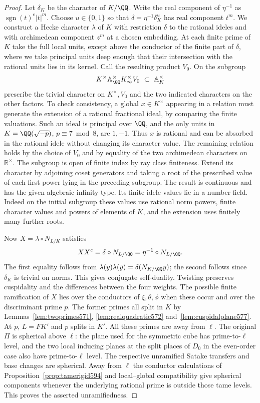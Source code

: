 \documentclass[a4paper,11pt]{article}
\theoremstyle{definition}
\theoremstyle{remark}
\numberwithin{equation}{section}
\begin{document}
\begin{proof}
Let \(\delta_K\) be the character of \(K/\QQ\).
Write the real component of \(\eta^{-1}\) as
\(\operatorname{sgn}(t)^e|t|^m\). Choose \(u\in\{0,1\}\)
so that \(\delta=\eta^{-1}\delta_K^u\) has real component
\(t^m\). We construct a Hecke character \(\lambda\) of
\(K\) with restriction \(\delta\) to the rational ideles
and with archimedean component \(z^m\) at a chosen embedding.
At each finite prime of \(K\) take the full local units,
except above the conductor of the finite part of \(\delta\),
where we take principal units deep enough that their
intersection with the rational units lies in its kernel.
Call the resulting product \(V_0\). On the subgroup
\[
          K^\times\mathbb A_\QQ^\times K_\infty^\times V_0
                      \ \subset\ \mathbb A_K^\times
\]
prescribe the trivial character on \(K^\times,V_0\) and the
two indicated characters on the other factors. To check
consistency, a global \(x\in K^\times\) appearing in a
relation must generate the extension of a rational
fractional ideal, by comparing the finite valuations.
Such an ideal is principal over \(\QQ\), and the only units
in \(K=\QQ(\sqrt{-p})\), \(p\equiv7\bmod8\), are \(1,-1\).
Thus \(x\) is rational and can be absorbed in the rational
idele without changing its character value. The remaining
relation holds by the choice of \(V_0\) and by equality
of the two archimedean characters on \(\mathbb R^\times\).
The subgroup is open of finite index by ray class finiteness.
Extend its character by adjoining coset generators and taking
a root of the prescribed value of each first power lying in
the preceding subgroup. The result is continuous and has
the given algebraic infinity type. Its finite-idele values
lie in a number field. Indeed on the initial subgroup these
values use rational norm powers, finite character values and
powers of elements of \(K\), and the extension uses finitely
many further roots.

Now \(X=\lambda\circ N_{L/K}\) satisfies
\[
              XX^c=\delta\circ N_{L/\QQ}
                   =\eta^{-1}\circ N_{L/\QQ}.
\]
The first equality follows from
\(\lambda(y)\lambda(\bar y)=\delta(N_{K/\QQ}y)\);
the second follows since \(\delta_K\) is trivial on norms.
This gives conjugate self-duality. Twisting preserves
cuspidality and the differences between the four weights.
The possible finite ramification of \(X\) lies over the
conductors of \(\xi,\theta,\phi\) when these occur and over
the discriminant prime \(p\). The former primes all split
in \(K\) by Lemmas~\ref{lem:twoprimes571},
\ref{lem:realquadratic572} and~\ref{lem:cuspidalplane577}.
At \(p\), \(L=FK'\) and \(p\) splits in \(K'\).
All these primes are away from \(\ell\). The original
\(\Pi\) is spherical above \(\ell\): the plane used for the
symmetric cube has prime-to-\(\ell\) level, and the two
local inducing planes at the split places of \(D_0\) in
the even-order case also have prime-to-\(\ell\) level.
The respective unramified Satake transfers and base changes
are spherical. Away from \(\ell\) the conductor calculations
of Proposition~\ref{prop:tamerigid594} and local--global
compatibility give spherical components whenever the
underlying rational prime is outside those tame levels.
This proves the asserted unramifiedness.


\end{proof}
\end{document}
